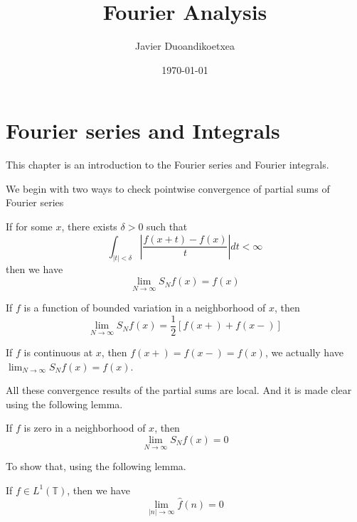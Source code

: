 \documentclass[lang=en,10pt, color=black]{../elegantbook}
\title{Fourier Analysis}
\author{Javier Duoandikoetxea}
\date{\today}
\newcommand{\T}{\mathbb{T}}
\begin{document}
\maketitle
\frontmatter
\newpage

\tableofcontents
\mainmatter

\chapter{Fourier series and Integrals}
This chapter is an introduction to the Fourier series and Fourier integrals.

We begin with two ways to check pointwise convergence of partial sums of Fourier series
\begin{theorem}
    If for some $x$, there exists $\delta>0$ such that 
    \begin{equation*}
        \int_{|t|<\delta}\left|\frac{f(x+t)-f(x)}{t} \right|dt<\infty
    \end{equation*}
    then we have
    \begin{equation*}
        \lim_{N\to\infty}S_Nf(x)=f(x)
    \end{equation*}
\end{theorem}

\begin{theorem}
    If $f$ is a function of bounded variation in a neighborhood of $x$, then
    \begin{equation*}
        \lim_{N\to\infty}S_Nf(x)=\frac{1}{2}[f(x+)+f(x-)]
    \end{equation*}
\end{theorem}
\begin{remark}
    If $f$ is continuous at $x$, then $f(x+)=f(x-)=f(x)$, we actually have $\lim_{N\to\infty}S_Nf(x)=f(x)$.
\end{remark}
\begin{note}
    All these convergence results of the partial sums are local. And it is made clear using the following lemma.
\end{note}

\begin{theorem}
    If $f$ is zero in a neighborhood of $x$, then 
    \begin{equation*}
        \lim_{N\to\infty}S_Nf(x)=0
    \end{equation*}
\end{theorem}

To show that, using the following lemma.
\begin{lemma}
    If $f\in L^1(\T)$, then we have
    \begin{equation*}
        \lim_{|n|\to\infty}\hat{f}(n)=0
    \end{equation*}
\end{lemma}
\end{document}
